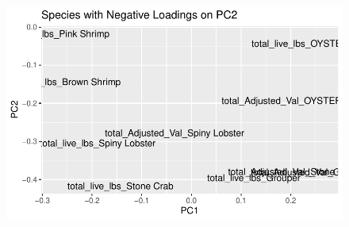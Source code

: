 \documentclass[
  letterpaper,
  DIV=11,
  numbers=noendperiod]{scrartcl}
\begin{document}
\begin{figure}[H]

{\centering \includegraphics{PCA_all_data_files/figure-pdf/unnamed-chunk-8-4.pdf}

}

\end{figure}
\end{document}
